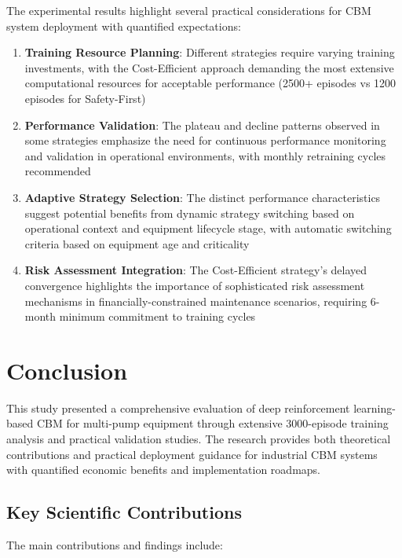 \documentclass[twocolumn]{article}
\begin{document}
The experimental results highlight several practical considerations for CBM system deployment with quantified expectations:

\begin{enumerate}
\item \textbf{Training Resource Planning}: Different strategies require varying training investments, with the Cost-Efficient approach demanding the most extensive computational resources for acceptable performance (2500+ episodes vs 1200 episodes for Safety-First)
\item \textbf{Performance Validation}: The plateau and decline patterns observed in some strategies emphasize the need for continuous performance monitoring and validation in operational environments, with monthly retraining cycles recommended
\item \textbf{Adaptive Strategy Selection}: The distinct performance characteristics suggest potential benefits from dynamic strategy switching based on operational context and equipment lifecycle stage, with automatic switching criteria based on equipment age and criticality
\item \textbf{Risk Assessment Integration}: The Cost-Efficient strategy's delayed convergence highlights the importance of sophisticated risk assessment mechanisms in financially-constrained maintenance scenarios, requiring 6-month minimum commitment to training cycles
\end{enumerate}

\section{Conclusion}

This study presented a comprehensive evaluation of deep reinforcement learning-based CBM for multi-pump equipment through extensive 3000-episode training analysis and practical validation studies. The research provides both theoretical contributions and practical deployment guidance for industrial CBM systems with quantified economic benefits and implementation roadmaps.

\subsection{Key Scientific Contributions}

The main contributions and findings include:
\end{document}

